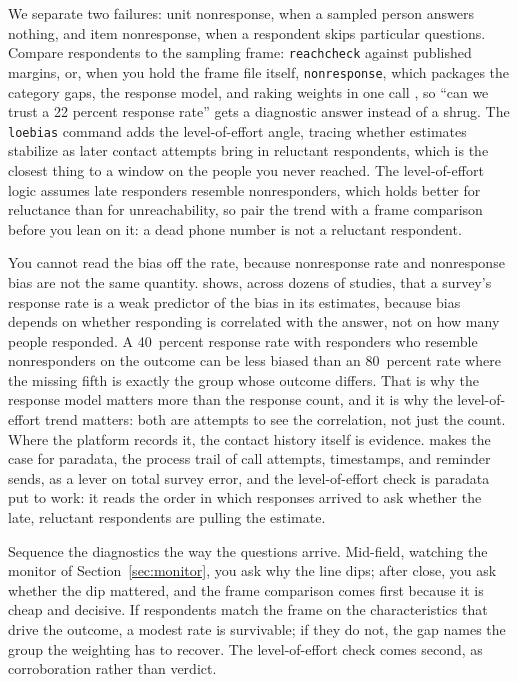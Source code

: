 We separate two failures: unit nonresponse, when a sampled person answers nothing, and item nonresponse, when a respondent skips particular questions. Compare respondents to the sampling frame: \texttt{reachcheck} against published margins, or, when you hold the frame file itself, \texttt{nonresponse}, which packages the category gaps, the response model, and raking weights in one call \parencite{groves2008nonresponse}, so \enquote{can we trust a 22 percent response rate} gets a diagnostic answer instead of a shrug. The \texttt{loebias} command adds the level-of-effort angle, tracing whether estimates stabilize as later contact attempts bring in reluctant respondents, which is the closest thing to a window on the people you never reached. The level-of-effort logic assumes late responders resemble nonresponders, which holds better for reluctance than for unreachability, so pair the trend with a frame comparison before you lean on it: a dead phone number is not a reluctant respondent.

You cannot read the bias off the rate, because nonresponse rate and nonresponse bias are not the same quantity. \textcite{groves2006nonresponse} shows, across dozens of studies, that a survey's response rate is a weak predictor of the bias in its estimates, because bias depends on whether responding is correlated with the answer, not on how many people responded. A 40~percent response rate with responders who resemble nonresponders on the outcome can be less biased than an 80~percent rate where the missing fifth is exactly the group whose outcome differs. That is why the response model matters more than the response count, and it is why the level-of-effort trend matters: both are attempts to see the correlation, not just the count. Where the platform records it, the contact history itself is evidence. \textcite{kreuter2013paradata} makes the case for paradata, the process trail of call attempts, timestamps, and reminder sends, as a lever on total survey error, and the level-of-effort check is paradata put to work: it reads the order in which responses arrived to ask whether the late, reluctant respondents are pulling the estimate.

Sequence the diagnostics the way the questions arrive. Mid-field, watching the monitor of Section~\ref{sec:monitor}, you ask why the line dips; after close, you ask whether the dip mattered, and the frame comparison comes first because it is cheap and decisive. If respondents match the frame on the characteristics that drive the outcome, a modest rate is survivable; if they do not, the gap names the group the weighting has to recover. The level-of-effort check comes second, as corroboration rather than verdict.

